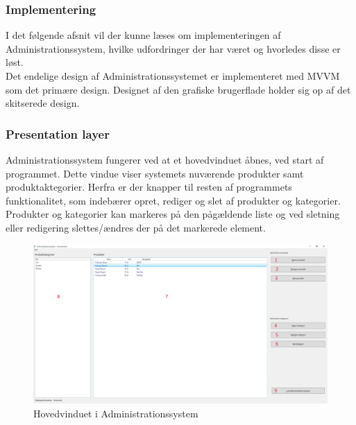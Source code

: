 \subsubsection{Implementering}
I det følgende afsnit vil der kunne læses om implementeringen af Administrationssystem, hvilke udfordringer der har været og hvorledes disse er løst.\\
Det endelige design af Administrationssystemet er implementeret med MVVM som det primære design. Designet af den grafiske brugerflade holder sig op af det skitserede design.\\


\subsubsection{Presentation layer}
Administrationssystem fungerer ved at et hovedvinduet åbnes, ved start af programmet. Dette vindue viser systemets nuværende produkter samt produktaktegorier. Herfra er der knapper til resten af programmets funktionalitet, som indebærer opret, rediger og slet af produkter og kategorier. Produkter og kategorier kan markeres på den pågældende liste og ved sletning eller redigering slettes/ændres der på det markerede element.\\

\begin{figure}[H]
	\centering
	\includegraphics[width=\textwidth]{Projektbeskrivelse/DesignOgImplementering/Images/BackendDemo}
	\caption{Hovedvinduet i Administrationssystem}
	\label{fig:admindemo}
\end{figure}

